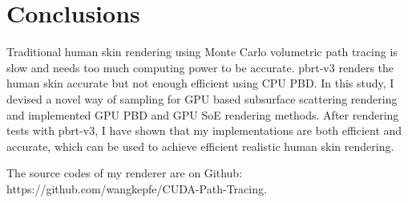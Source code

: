 \documentclass[letterpaper,12pt]{article}
\begin{document}
\section{Conclusions}

Traditional human skin rendering using Monte Carlo volumetric path tracing is slow and needs too much computing power to be accurate. pbrt-v3 renders the human skin accurate but not enough efficient using CPU PBD. In this study, I devised a novel way of sampling for GPU based subsurface scattering rendering and implemented GPU PBD and GPU SoE rendering methods. After rendering tests with pbrt-v3, I have shown that my implementations are both efficient and accurate, which can be used to achieve efficient realistic human skin rendering.

The source codes of my renderer are on Github: https://github.com/wangkepfe/CUDA-Path-Tracing.

{}

\end{document}
